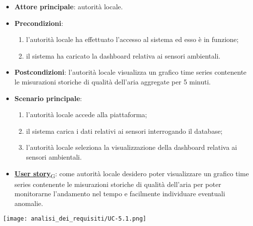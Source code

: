 \begin{itemize}
	\item \textbf{Attore principale}: autorità locale.
	\item \textbf{Precondizioni}:
	      \begin{enumerate}
		      \item l'autorità locale ha effettuato l'accesso al sistema ed esso è in funzione;
		      \item il sistema ha caricato la dashboard relativa ai sensori ambientali.
	      \end{enumerate}
	\item \textbf{Postcondizioni}: l'autorità locale visualizza un grafico time series contenente le misurazioni storiche
	      di qualità dell'aria aggregate per 5 minuti.
	\item \textbf{Scenario principale}:
	      \begin{enumerate}
		      \item l'autorità locale accede alla piattaforma;
		      \item il sistema carica i dati relativi ai sensori interrogando il database;
		      \item l'autorità locale seleziona la visualizzazione della dashboard relativa ai sensori ambientali.
	      \end{enumerate}
	\item \href{https://7last.github.io/docs/rtb/documentazione-interna/glossario\#user-story}{\textbf{User story}\textsubscript{G}}:
	      come autorità locale desidero poter visualizzare un grafico time series contenente le misurazioni storiche
	      di qualità dell'aria per poter monitorarne l'andamento nel tempo e facilmente individuare eventuali anomalie.
\end{itemize}
\begin{center}
	\texttt{[image: analisi\_dei\_requisiti/UC-5.1.png]}
\end{center}


